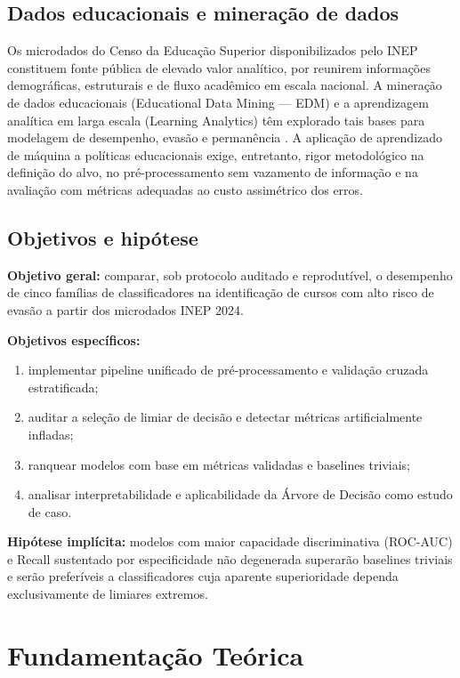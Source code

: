 \documentclass[conference]{IEEEtran}
\begin{document}
\subsection{Dados educacionais e mineração de dados}
Os microdados do Censo da Educação Superior disponibilizados pelo INEP constituem fonte pública de elevado valor analítico, por reunirem informações demográficas, estruturais e de fluxo acadêmico em escala nacional. A mineração de dados educacionais (Educational Data Mining --- EDM) e a aprendizagem analítica em larga escala (Learning Analytics) têm explorado tais bases para modelagem de desempenho, evasão e permanência \cite{romero2020}. A aplicação de aprendizado de máquina a políticas educacionais exige, entretanto, rigor metodológico na definição do alvo, no pré-processamento sem vazamento de informação e na avaliação com métricas adequadas ao custo assimétrico dos erros.

\subsection{Objetivos e hipótese}
\textbf{Objetivo geral:} comparar, sob protocolo auditado e reprodutível, o desempenho de cinco famílias de classificadores na identificação de cursos com alto risco de evasão a partir dos microdados INEP 2024.

\textbf{Objetivos específicos:}
\begin{enumerate}
    \item implementar pipeline unificado de pré-processamento e validação cruzada estratificada;
    \item auditar a seleção de limiar de decisão e detectar métricas artificialmente infladas;
    \item ranquear modelos com base em métricas validadas e baselines triviais;
    \item analisar interpretabilidade e aplicabilidade da Árvore de Decisão como estudo de caso.
\end{enumerate}

\textbf{Hipótese implícita:} modelos com maior capacidade discriminativa (ROC-AUC) e Recall sustentado por especificidade não degenerada superarão baselines triviais e serão preferíveis a classificadores cuja aparente superioridade dependa exclusivamente de limiares extremos.

\section{Fundamentação Teórica}
\end{document}

